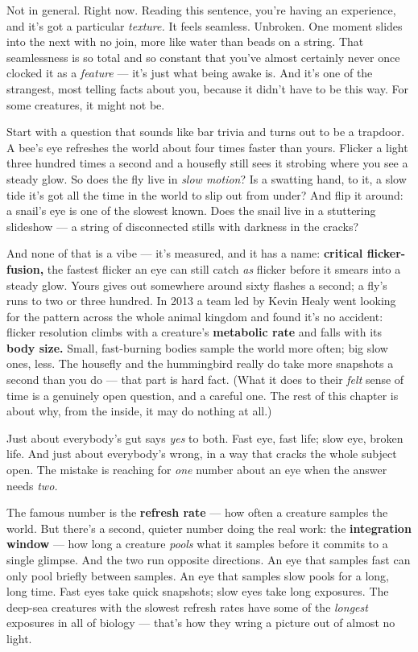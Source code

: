 \documentclass[11pt,openany]{book}
\begin{document}
Not in general. Right now. Reading this sentence, you’re having an experience, and it’s got a particular \textit{texture.} It feels seamless. Unbroken. One moment slides into the next with no join, more like water than beads on a string. That seamlessness is so total and so constant that you’ve almost certainly never once clocked it as a \textit{feature} — it’s just what being awake is. And it’s one of the strangest, most telling facts about you, because it didn’t have to be this way. For some creatures, it might not be.

Start with a question that sounds like bar trivia and turns out to be a trapdoor. A bee’s eye refreshes the world about four times faster than yours. Flicker a light three hundred times a second and a housefly still sees it strobing where you see a steady glow. So does the fly live in \textit{slow motion}? Is a swatting hand, to it, a slow tide it’s got all the time in the world to slip out from under? And flip it around: a snail’s eye is one of the slowest known. Does the snail live in a stuttering slideshow — a string of disconnected stills with darkness in the cracks?

And none of that is a vibe — it’s measured, and it has a name: \textbf{critical flicker-fusion,} the fastest flicker an eye can still catch \textit{as} flicker before it smears into a steady glow. Yours gives out somewhere around sixty flashes a second; a fly’s runs to two or three hundred. In 2013 a team led by Kevin Healy went looking for the pattern across the whole animal kingdom and found it’s no accident: flicker resolution climbs with a creature’s \textbf{metabolic rate} and falls with its \textbf{body size.} Small, fast-burning bodies sample the world more often; big slow ones, less. The housefly and the hummingbird really do take more snapshots a second than you do — that part is hard fact. (What it does to their \textit{felt} sense of time is a genuinely open question, and a careful one. The rest of this chapter is about why, from the inside, it may do nothing at all.)

Just about everybody’s gut says \textit{yes} to both. Fast eye, fast life; slow eye, broken life. And just about everybody’s wrong, in a way that cracks the whole subject open. The mistake is reaching for \textit{one} number about an eye when the answer needs \textit{two.}

The famous number is the \textbf{refresh rate} — how often a creature samples the world. But there’s a second, quieter number doing the real work: the \textbf{integration window} — how long a creature \textit{pools} what it samples before it commits to a single glimpse. And the two run opposite directions. An eye that samples fast can only pool briefly between samples. An eye that samples slow pools for a long, long time. Fast eyes take quick snapshots; slow eyes take long exposures. The deep-sea creatures with the slowest refresh rates have some of the \textit{longest} exposures in all of biology — that’s how they wring a picture out of almost no light.
\end{document}
